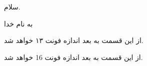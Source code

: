 \documentclass[10pt]{article}
\begin{document}
	سلام.
	
	به نام خدا
	
	\fontsize{13}{14}\selectfont
	از این قسمت به بعد اندازه فونت ۱۳ خواهد شد.
	
	\fontsize{16}{17}\selectfont
	از این قسمت به بعد اندازه فونت 16 خواهد شد.
\end{document}
